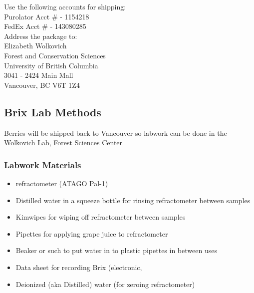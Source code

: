 \documentclass[11pt,letter]{article}
\newenvironment{smitemize}{
\begin{itemize}
  \setlength{\itemsep}{0pt}
  \setlength{\parskip}{0.8pt}
  \setlength{\parsep}{0pt}}
{\end{itemize}
}
\begin{document}
Use the following accounts for shipping: \\
Purolator Acct \# - 1154218 \\
FedEx Acct \# - 143080285 \\

Address the package to: \\
Elizabeth Wolkovich \\
Forest and Conservation Sciences \\
University of British Columbia \\
3041 - 2424 Main Mall \\
Vancouver, BC V6T 1Z4 \\

\subsection{Brix Lab Methods}
Berries will be shipped back to Vancouver so labwork can be done in the Wolkovich Lab, Forest Sciences Center

\subsubsection{Labwork Materials}
\begin{smitemize}
\item refractometer (ATAGO Pal-1) 
\item Distilled water in a squeeze bottle for rinsing refractometer between samples %
\item Kimwipes for wiping off refractometer between samples
\item Pipettes for applying grape juice to refractometer 
\item Beaker or such to put water in to plastic pipettes in between uses 
\item Data sheet for recording Brix (electronic, %
\item Deionized (aka Distilled) water (for zeroing refractometer)

\end{smitemize}
\end{document}
